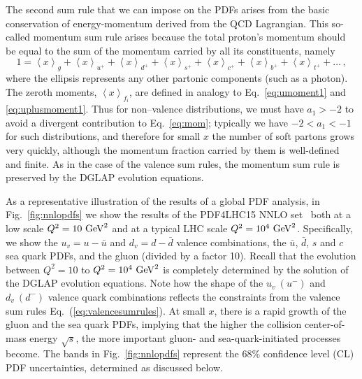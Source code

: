 The second sum rule that we can impose on the PDFs arises
from the basic conservation of energy-momentum derived from
the QCD Lagrangian.
%
This so-called momentum sum rule arises
because the total
proton's momentum should be equal to the sum of the momentum
carried by all its constituents, namely
\begin{equation}\label{eq:mom}
1 = \left\langle x\right\rangle _{g}+\left\langle x\right\rangle _{u^{+}}+\left\langle x\right\rangle _{d^{+}}+\left\langle x\right\rangle _{s^{+}}+\left\langle x\right\rangle _{c^{+}}+\left\langle x\right\rangle _{b^{+}}+\left\langle x\right\rangle _{t^{+}}+\ldots\,,
\end{equation}
%
where the ellipsis represents any other partonic components (such
as a photon). The zeroth moments, $\left\langle x\right\rangle _{f_i}$, are defined in analogy to Eq.~\eqref{eq:umoment1} and \eqref{eq:uplusmoment1}. Thus for non--valence distributions, we must have $a_1>-2$ to avoid a divergent contribution to
Eq.~\eqref{eq:mom}; typically we have $-2<a_1<-1$ for such distributions, and therefore for small $x$ the number of soft partons
grows very quickly, although the momentum fraction carried by them is well-defined
and finite.
%
As in the case of the valence sum rules, the momentum
sum rule is preserved by the DGLAP evolution equations.

As a representative illustration of the results of a global
PDF analysis, in Fig.~\ref{fig:nnlopdfs} we show
the results of the PDF4LHC15 NNLO set~\cite{Butterworth:2015oua}
both at a low scale
    $Q^2=10~{\rm GeV}^2$  and at a typical LHC scale
    $Q^2=10^4~{\rm GeV}^2$.
    Specifically, we show the  $u_v=u-\bar{u}$ and $d_v=d-\bar{d}$ valence combinations, the $\bar{u}$,
    $\bar{d}$, $s$ and $c$ sea quark PDFs, and the gluon (divided by a factor 10).
    Recall that the evolution between $Q^2=10$ to $Q^2=10^4~{\rm GeV}^2$ is completely
    determined by the solution of
     the DGLAP evolution equations.
    Note how the shape of the $u_v~(u^{-})$ and $d_v~(d^{-})$ valence quark combinations
    reflects the constraints from the valence sum rules Eq.~(\ref{eq:valencesumrules}).
    At small $x$, there is a rapid growth of the gluon and the sea quark PDFs, implying
    that the higher the collision center-of-mass energy $\sqrt{s}$, the more
    important gluon- and sea-quark-initiated processes become.
    The bands in Fig.~\ref{fig:nnlopdfs} represent the 68\% confidence level (CL)
    PDF uncertainties, determined as discussed below.

